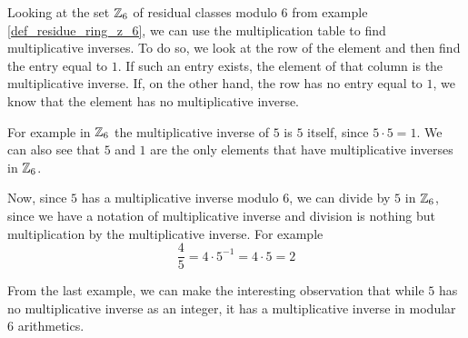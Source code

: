 \begin{example} Looking at the set $\mathbb{Z}_6$ of residual classes modulo $6$ from example \ref{def_residue_ring_z_6}, we can use the multiplication table to find multiplicative inverses. To do so, we look at the row of the element and then find the entry equal to $1$. If such an entry exists, the element of that column is the multiplicative inverse. If, on the other hand, the row has no entry equal to $1$, we know that the element has no multiplicative inverse.

For example in $\mathbb{Z}_6$ the multiplicative inverse of $5$ is $5$ itself, since $5\cdot 5=1$. We can also see that $5$ and $1$ are the only elements that have multiplicative inverses in $\mathbb{Z}_6$. 

Now, since $5$ has a multiplicative inverse modulo $6$, we can divide by $5$ in $\mathbb{Z}_6$, since we have a notation of multiplicative inverse and division is nothing but multiplication by the multiplicative inverse. For example
$$
\frac{4}{5}= 4\cdot 5^{-1} = 4\cdot 5 = 2
$$ 
\end{example}
From the last example, we can make the interesting observation that while $5$ has no multiplicative inverse as an integer, it has a multiplicative inverse in modular $6$ arithmetics. 

